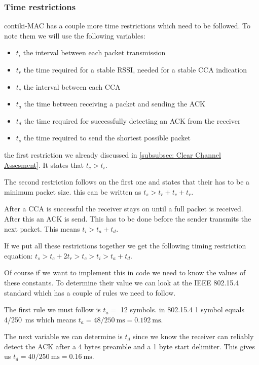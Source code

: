 \subsubsection{Time restrictions}\label{subsubsec: Time restrictions}
contiki-MAC has a couple more time restrictions which need to be followed. To note them we will use the following variables:
\begin{itemize}
    \item $t_i$ the interval between each packet transmission
    \item $t_r$ the time required for a stable RSSI, needed for a stable CCA indication
    \item $t_c$ the interval between each CCA
    \item $t_a$ the time between receiving a packet and sending the ACK
    \item $t_d$ the time required for successfully detecting an ACK from the receiver
    \item $t_s$ the time required to send the shortest possible packet
\end{itemize}

the first restriction we already discussed in \ref{subsubsec: Clear Channel Assesment}. It states that $t_c > t_i$.

The second restriction follows on the first one and states that their has to be a minimum packet size. this can be written as $t_s > t_r + t_c + t_r$.

After a CCA is successful the receiver stays on until a full packet is received. After this an ACK is send. This has to be done before the sender transmits the next packet. This means $ t_i > t_a + t_d$.

If we put all these restrictions together we get the following timing restriction equation:    \newline $t_s > t_c + 2t_r > t_c > t_i > t_a + t_d$.

Of course if we want to implement this in code we need to know the values of these constants. To determine their value we can look at the IEEE 802.15.4 standard which has a couple of rules we need to follow.

The first rule we must follow is  $t_a = $ 12 symbols. in 802.15.4 1 symbol equals 4/250~ms which means $t_a = 48/250~\text{ms} = 0.192~\text{ms}$.

The next variable we can determine is $t_d$ since we know the receiver can reliably detect the ACK after a 4 bytes preamble and a 1 byte start delimiter. This gives us $t_d = 40/250~\text{ms} = 0.16~\text{ms}$.

